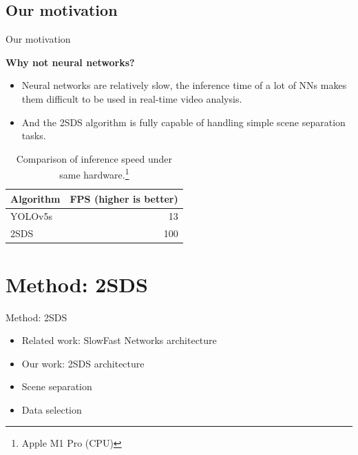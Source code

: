 \documentclass[aspectratio=43,display]{beamer}
\begin{document}
	\subsection{Our motivation}

		\begin{frame}{Our motivation}

			\textbf{Why not neural networks?}

			\begin{itemize}
				\item Neural networks are relatively slow, the inference time of a lot of NNs makes them difficult to be used in real-time video analysis.
				\item And the 2SDS algorithm is fully capable of handling simple scene separation tasks.
			\end{itemize}

			\vskip 0.3cm

			\begin{table}
				\centering
				\begin{tabular}{l|r}
				Algorithm & FPS (higher is better) \\\hline
				YOLOv5s & 13 \\
				2SDS & 100
				\end{tabular}
			\caption{\label{tab:widgets}Comparison of inference speed under same hardware.\footnote{Apple M1 Pro (CPU)}}
			\end{table}


		\end{frame}


	\section{Method: 2SDS}

		\begin{frame}{Method: 2SDS}

			\begin{itemize}
				\item Related work: SlowFast Networks architecture
				\item Our work: 2SDS architecture
				\item Scene separation
				\item Data selection
			\end{itemize}

		\end{frame}
\end{document}
